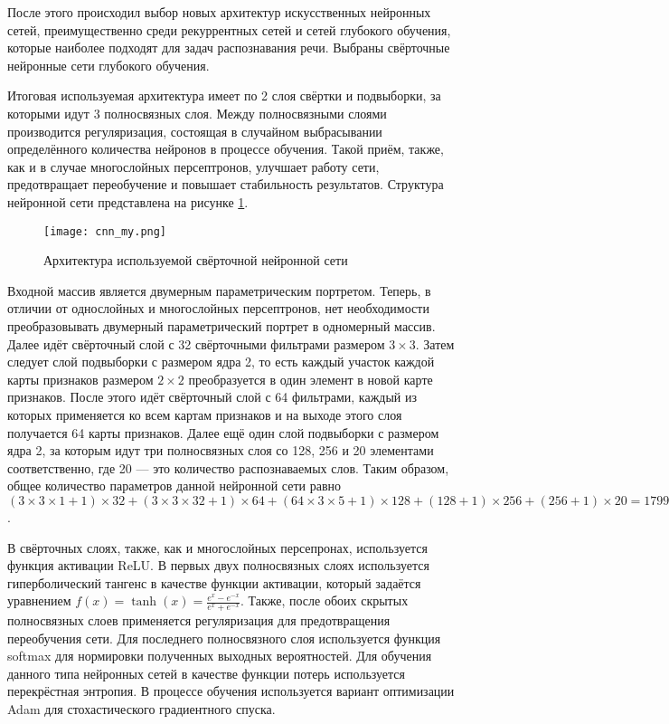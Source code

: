 После этого происходил выбор новых архитектур искусственных нейронных сетей, преимущественно среди рекуррентных сетей и сетей глубокого обучения, которые наиболее подходят для задач распознавания речи.
Выбраны свёрточные нейронные сети глубокого обучения.

Итоговая используемая архитектура имеет по 2 слоя свёртки и подвыборки, за которыми идут 3 полносвязных слоя.
Между полносвязными слоями производится регуляризация, состоящая в случайном выбрасывании определённого количества нейронов в процессе обучения.
Такой приём, также, как и в случае многослойных персептронов, улучшает работу сети, предотвращает переобучение и повышает стабильность результатов.
Структура нейронной сети представлена на рисунке \ref{fig:cnn_my}.

\begin{figure}[h]
	\centering
	\texttt{[image: cnn\_my.png]}
	\caption{Архитектура используемой свёрточной нейронной сети}
	\label{fig:cnn_my}
\end{figure}

Входной массив является двумерным параметрическим портретом.
Теперь, в отличии от однослойных и многослойных персептронов, нет необходимости преобразовывать двумерный параметрический портрет в одномерный массив.
Далее идёт свёрточный слой с 32 свёрточными фильтрами размером $3 \times 3$.
Затем следует слой подвыборки с размером ядра 2, то есть каждый участок каждой карты признаков размером $2 \times 2$ преобразуется в один элемент в новой карте признаков.
После этого идёт свёрточный слой с 64 фильтрами, каждый из которых применяется ко всем картам признаков и на выходе этого слоя получается 64 карты признаков.
Далее ещё один слой подвыборки с размером ядра 2, за которым идут три полносвязных слоя со 128, 256 и 20 элементами соответственно, где 20 --- это количество распознаваемых слов.
Таким образом, общее количество параметров данной нейронной сети равно $(3 \times 3 \times 1 + 1) \times 32 + (3 \times 3 \times 32 + 1)  \times 64 + (64 \times 3 \times 5 + 1) \times 128 + (128 + 1) \times 256 + (256 + 1) \times 20 = 179 988$.

В свёрточных слоях, также, как и многослойных персепронах, используется функция активации ReLU.
В первых двух полносвязных слоях используется гиперболический тангенс в качестве функции активации, который задаётся уравнением $f(x) = \tanh(x) = \frac{e^x - e^{-x}}{e^x + e^{-x}}$.
Также, после обоих скрытых полносвязных слоев применяется регуляризация для предотвращения переобучения сети.
Для последнего полносвязного слоя используется функция softmax для нормировки полученных выходных вероятностей.
Для обучения данного типа нейронных сетей в качестве функции потерь используется перекрёстная энтропия.
В процессе обучения используется вариант оптимизации Adam для стохастического градиентного спуска.

